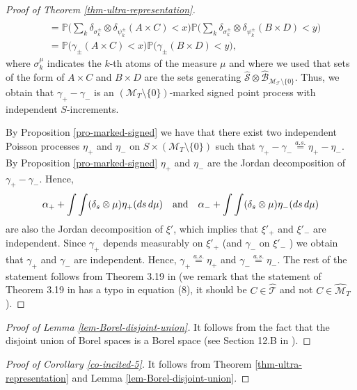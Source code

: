 \documentclass{article}
\theoremstyle{plain}
\theoremstyle{remark}
\begin{document}
\begin{proof}[Proof of Theorem \ref{thm-ultra-representation}]
\begin{align*}
	\end{align*}
	\begin{align*}
		& 	=\mathbb{P}\bigg(\sum_{k}\delta_{\sigma^{\pm}_{k}}\otimes\delta_{\psi^\pm_{k}}(A\times C)<x\Big)\mathbb{P}\Big(\sum_{k}\delta_{\sigma^{\pm}_{k}}\otimes\delta_{\psi^\pm_{k}}(B\times D)<y\bigg)\\&			=	\mathbb{P}\Big(\gamma_\pm(A\times C)<x\Big)\mathbb{P}\Big(\gamma_\pm(B\times D)<y\Big),
	\end{align*}
	where $\sigma^{\mu}_{k}$ indicates the $k$-th atoms of the measure $\mu$ and where we used that sets of the form of $A\times C$ and $B\times D$ are the sets generating $\hat{\mathcal{S}}\otimes\hat{\mathcal{B}}_{\mathcal{M}_\mathcal{T}\setminus\{0\}}$. Thus, we obtain that $\gamma_+-\gamma_-$ is an $(\mathcal{M}_T\setminus\{0\})$-marked signed point process with independent $S$-increments. 
	
	By Proposition \ref{pro-marked-signed} we have that there exist two independent Poisson processes $\eta_+$ and $\eta_-$ on $S\times( \mathcal{M}_T\setminus\{0\})$ such that $\gamma_+-\gamma_-\stackrel{a.s.}{=}\eta_+-\eta_-$. By Proposition \ref{pro-marked-signed}  $\eta_+$ and $\eta_-$ are the Jordan decomposition of $\gamma_+-\gamma_-$. Hence,
	\begin{equation*}
		\alpha_++\int\int (\delta_s\otimes\mu)\eta_+(ds\,d\mu)\quad\textnormal{and}\quad \alpha_-+\int\int (\delta_s\otimes\mu)\eta_-(ds\,d\mu)
	\end{equation*}
	are also the Jordan decomposition of $\xi'$, which implies that $\xi'_+$ and $\xi'_-$ are independent. Since $\gamma_+$ depends measurably on  $\xi'_+$ (and $\gamma_-$ on $\xi'_-$ ) we obtain that $\gamma_+$  and $\gamma_-$ are independent. Hence, $\gamma_+\stackrel{a.s.}{=}\eta_+$ and $\gamma_-\stackrel{a.s.}{=}\eta_-$. The rest of the statement follows from Theorem 3.19 in \cite{Kallenberg2} (we remark that the statement of Theorem 3.19 in \cite{Kallenberg2} has a typo in equation (8), it should be $C\in\hat{\mathcal{T}}$ and not $C\in\hat{\mathcal{M}}_T$).
\end{proof}


\begin{proof}[Proof of Lemma \ref{lem-Borel-disjoint-union}]
	It follows from the fact that the disjoint union of Borel spaces is a Borel space (see Section 12.B in \cite{Kechris}).
\end{proof}


\begin{proof}[Proof of Corollary \ref{co-incited-5}]
	It follows from Theorem \ref{thm-ultra-representation} and Lemma \ref{lem-Borel-disjoint-union}.
\end{proof}
\end{document}
